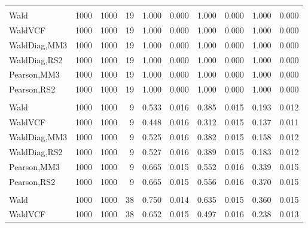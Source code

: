 \documentclass[
]{article}
\begin{document}
\begin{table}[H]
{\begin{tabular}[t]{lrrrrrrlrr}
\addlinespace[0.3em]
\multicolumn{10}{l}{\textbf{1F 15V}}\\
\hspace{1em}Wald & 1000 & 1000 & 19 & 1.000 & 0.000 & 1.000 & 0.000 & 1.000 & 0.000\\
\hspace{1em}WaldVCF & 1000 & 1000 & 19 & 1.000 & 0.000 & 1.000 & 0.000 & 1.000 & 0.000\\
\hspace{1em}WaldDiag,MM3 & 1000 & 1000 & 19 & 1.000 & 0.000 & 1.000 & 0.000 & 1.000 & 0.000\\
\hspace{1em}WaldDiag,RS2 & 1000 & 1000 & 19 & 1.000 & 0.000 & 1.000 & 0.000 & 1.000 & 0.000\\
\hspace{1em}Pearson,MM3 & 1000 & 1000 & 19 & 1.000 & 0.000 & 1.000 & 0.000 & 1.000 & 0.000\\
\hspace{1em}Pearson,RS2 & 1000 & 1000 & 19 & 1.000 & 0.000 & 1.000 & 0.000 & 1.000 & 0.000\\
\addlinespace[0.3em]
\multicolumn{10}{l}{\textbf{2F 10V}}\\
\hspace{1em}Wald & 1000 & 1000 & 9 & 0.533 & 0.016 & 0.385 & 0.015 & 0.193 & 0.012\\
\hspace{1em}WaldVCF & 1000 & 1000 & 9 & 0.448 & 0.016 & 0.312 & 0.015 & 0.137 & 0.011\\
\hspace{1em}WaldDiag,MM3 & 1000 & 1000 & 9 & 0.525 & 0.016 & 0.382 & 0.015 & 0.158 & 0.012\\
\hspace{1em}WaldDiag,RS2 & 1000 & 1000 & 9 & 0.527 & 0.016 & 0.389 & 0.015 & 0.183 & 0.012\\
\hspace{1em}Pearson,MM3 & 1000 & 1000 & 9 & 0.665 & 0.015 & 0.552 & 0.016 & 0.339 & 0.015\\
\hspace{1em}Pearson,RS2 & 1000 & 1000 & 9 & 0.665 & 0.015 & 0.556 & 0.016 & 0.370 & 0.015\\
\addlinespace[0.3em]
\multicolumn{10}{l}{\textbf{3F 15V}}\\
\hspace{1em}Wald & 1000 & 1000 & 38 & 0.750 & 0.014 & 0.635 & 0.015 & 0.360 & 0.015\\
\hspace{1em}WaldVCF & 1000 & 1000 & 38 & 0.652 & 0.015 & 0.497 & 0.016 & 0.238 & 0.013\\

\end{tabular}}
\end{table}
\end{document}
